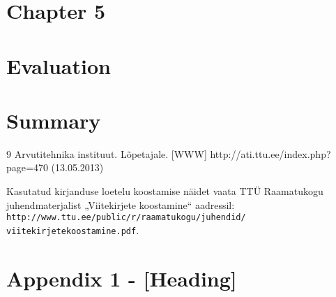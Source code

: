 \documentclass[12pt]{article} %
\begin{document}

\pagebreak

\section{Chapter 5}
\label{Chapter 5}


\pagebreak

\section{Evaluation}
\label{Evaluation}


\pagebreak

\section{Summary}
\label{Summary}


\pagebreak



\begin{thebibliography} {9}
Arvutitehnika instituut. Lõpetajale. [WWW] http://ati.ttu.ee/index.php?page=470 (13.05.2013)
\end{thebibliography}

Kasutatud kirjanduse loetelu koostamise näidet vaata TTÜ Raamatukogu juhendmaterjalist „Viitekirjete koostamine“ aadressil: \texttt{http://www.ttu.ee/public/r/raamatukogu/juhendid/
viitekirjetekoostamine.pdf}.

\pagebreak

\section*{Appendix 1 - [Heading]}

\end{document}
